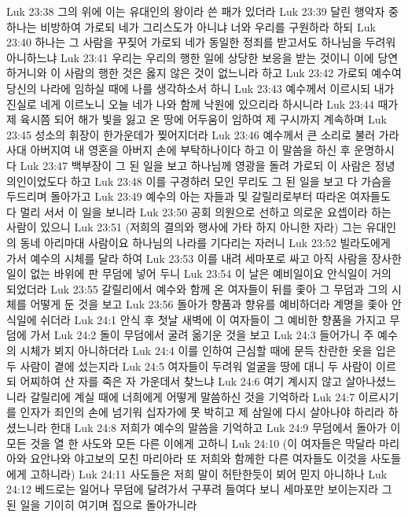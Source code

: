 Luk 23:38  그의 위에 이는 유대인의 왕이라 쓴 패가 있더라
Luk 23:39  달린 행악자 중 하나는 비방하여 가로되 네가 그리스도가 아니냐 너와 우리를 구원하라 하되
Luk 23:40  하나는 그 사람을 꾸짖어 가로되 네가 동일한 정죄를 받고서도 하나님을 두려워 아니하느냐
Luk 23:41  우리는 우리의 행한 일에 상당한 보응을 받는 것이니 이에 당연하거니와 이 사람의 행한 것은 옳지 않은 것이 없느니라 하고
Luk 23:42  가로되 예수여 당신의 나라에 임하실 때에 나를 생각하소서 하니
Luk 23:43  예수께서 이르시되 내가 진실로 네게 이르노니 오늘 네가 나와 함께 낙원에 있으리라 하시니라
Luk 23:44  때가 제 육시쯤 되어 해가 빛을 잃고 온 땅에 어두움이 임하여 제 구시까지 계속하며
Luk 23:45  성소의 휘장이 한가운데가 찢어지더라
Luk 23:46  예수께서 큰 소리로 불러 가라사대 아버지여 내 영혼을 아버지 손에 부탁하나이다 하고 이 말씀을 하신 후 운명하시다
Luk 23:47  백부장이 그 된 일을 보고 하나님께 영광을 돌려 가로되 이 사람은 정녕 의인이었도다 하고
Luk 23:48  이를 구경하러 모인 무리도 그 된 일을 보고 다 가슴을 두드리며 돌아가고
Luk 23:49  예수의 아는 자들과 및 갈릴리로부터 따라온 여자들도 다 멀리 서서 이 일을 보니라
Luk 23:50  공회 의원으로 선하고 의로운 요셉이라 하는 사람이 있으니
Luk 23:51  (저희의 결의와 행사에 가타 하지 아니한 자라) 그는 유대인의 동네 아리마대 사람이요 하나님의 나라를 기다리는 자러니
Luk 23:52  빌라도에게 가서 예수의 시체를 달라 하여
Luk 23:53  이를 내려 세마포로 싸고 아직 사람을 장사한 일이 없는 바위에 판 무덤에 넣어 두니
Luk 23:54  이 날은 예비일이요 안식일이 거의 되었더라
Luk 23:55  갈릴리에서 예수와 함께 온 여자들이 뒤를 좇아 그 무덤과 그의 시체를 어떻게 둔 것을 보고
Luk 23:56  돌아가 향품과 향유를 예비하더라 계명을 좇아 안식일에 쉬더라
Luk 24:1  안식 후 첫날 새벽에 이 여자들이 그 예비한 향품을 가지고 무덤에 가서
Luk 24:2  돌이 무덤에서 굴려 옮기운 것을 보고
Luk 24:3  들어가니 주 예수의 시체가 뵈지 아니하더라
Luk 24:4  이를 인하여 근심할 때에 문득 찬란한 옷을 입은 두 사람이 곁에 섰는지라
Luk 24:5  여자들이 두려워 얼굴을 땅에 대니 두 사람이 이르되 어찌하여 산 자를 죽은 자 가운데서 찾느냐
Luk 24:6  여기 계시지 않고 살아나셨느니라 갈릴리에 계실 때에 너희에게 어떻게 말씀하신 것을 기억하라
Luk 24:7  이르시기를 인자가 죄인의 손에 넘기워 십자가에 못 박히고 제 삼일에 다시 살아나야 하리라 하셨느니라 한대
Luk 24:8  저희가 예수의 말씀을 기억하고
Luk 24:9  무덤에서 돌아가 이 모든 것을 열 한 사도와 모든 다른 이에게 고하니
Luk 24:10  (이 여자들은 막달라 마리아와 요안나와 야고보의 모친 마리아라 또 저희와 함께한 다른 여자들도 이것을 사도들에게 고하니라)
Luk 24:11  사도들은 저희 말이 허탄한듯이 뵈어 믿지 아니하나
Luk 24:12  베드로는 일어나 무덤에 달려가서 구푸려 들여다 보니 세마포만 보이는지라 그 된 일을 기이히 여기며 집으로 돌아가니라
